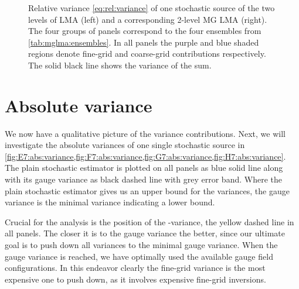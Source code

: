 \begin{figure}
\centering

\hfill
{}

\hfill
{}

\caption{Relative variance \cref{eq:rel:variance} of one stochastic source of the two levels of LMA (left) and a corresponding 2-level MG LMA (right). The four groups of panels correspond to the four ensembles from \cref{tab:mglma:ensembles}. In all panels the purple and blue shaded regions denote fine-grid and coarse-grid contributions respectively. The solid black line shows the variance of the sum.}
\label{fig:rel:variance}
\end{figure}

\section{Absolute variance}
\label{sec:numerics:abs:variance}

We now have a qualitative picture of the variance contributions.
Next, we will investigate the absolute variances of one single stochastic source in \cref{fig:E7:abs:variance,fig:F7:abs:variance,fig:G7:abs:variance,fig:H7:abs:variance}.
The plain stochastic estimator is plotted on all panels as blue solid line along with its gauge variance as black dashed line with grey error band.
Where the plain stochastic estimator gives us an upper bound for the variances, the gauge variance is the minimal variance indicating a lower bound.

Crucial for the analysis is the position of the -variance, the yellow dashed line in all panels.
The closer it is to the gauge variance the better, since our ultimate goal is to push down all variances to the minimal gauge variance.
When the gauge variance is reached, we have optimally used the available gauge field configurations.
In this endeavor clearly the fine-grid variance is the most expensive one to push down, as it involves expensive fine-grid inversions.

